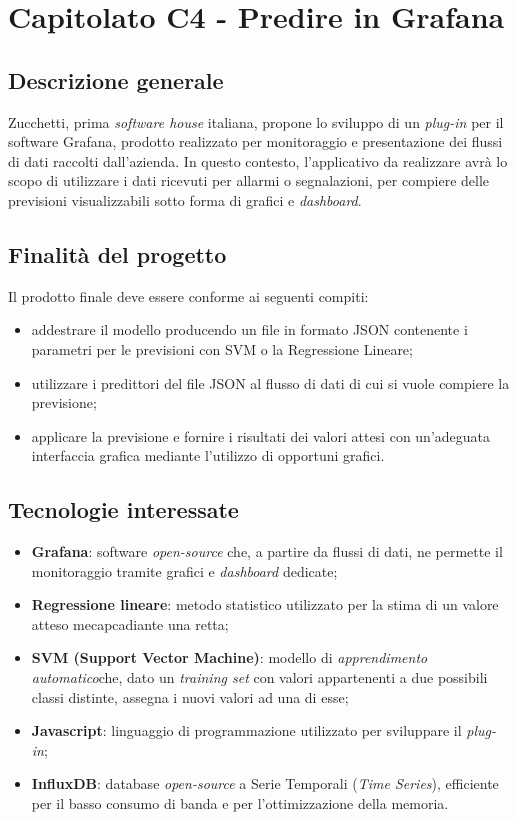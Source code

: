 \section{Capitolato C4 - Predire in Grafana}

\subsection{Descrizione generale}
Zucchetti, prima \textit{software house\glo} italiana, propone lo sviluppo di un \textit{plug-in\glo} per il software Grafana, prodotto realizzato per monitoraggio e presentazione dei flussi di dati raccolti dall'azienda. In questo contesto, l'applicativo da realizzare avrà lo scopo di utilizzare i dati ricevuti per allarmi o segnalazioni, per compiere delle previsioni visualizzabili sotto forma di grafici e \textit{dashboard\glos}.

\subsection{Finalità del progetto}
Il prodotto finale deve essere conforme ai seguenti compiti:
\begin{itemize}
	\item addestrare il modello producendo un file in formato JSON contenente i parametri per le previsioni con SVM o la Regressione Lineare;
	\item utilizzare i predittori del file JSON al flusso di dati di cui si vuole compiere la previsione;
	\item applicare la previsione e fornire i risultati dei valori attesi con un'adeguata interfaccia grafica mediante l'utilizzo di opportuni grafici.
\end{itemize}

\subsection{Tecnologie interessate}
\begin{itemize}
	\item \textbf{Grafana}: software \textit{open-source\glo} che, a partire da flussi di dati, ne permette il monitoraggio tramite grafici e \textit{dashboard\glo} dedicate;
	\item \textbf{Regressione lineare}: metodo statistico utilizzato per la stima di un valore atteso mecapcadiante una retta;
	\item \textbf{SVM (Support Vector Machine)}:  modello di \textit{apprendimento automatico}\glo che, dato un \textit{training set\glo} con valori appartenenti a due possibili classi distinte, assegna i nuovi valori ad una di esse;
	\item \textbf{Javascript}: linguaggio di programmazione utilizzato per sviluppare il \textit{plug-in\glos};
	\item \textbf{InfluxDB}: database \textit{open-source\glo} a Serie Temporali (\textit{Time Series\glos}), efficiente per il basso consumo di banda e per l'ottimizzazione della memoria.
\end{itemize}

